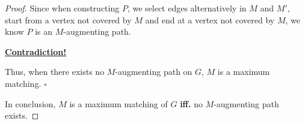 \documentclass{article}
\newcommand{\whiteqed}{\hfill $\square$\par}
\begin{document}
\begin{proof}
    \hspace{1.3em}
    Since when constructing $P$, we select edges alternatively in $M$ and $M'$, start from a vertex not covered by $M$ and end at a vertex not covered by $M$, we know $P$ is an $M$-augmenting path.
    
    \hspace{1.3em}
    \underline{\textbf{Contradiction!}}
    
    \hspace{1.3em}
    Thus, when there exists no $M$-augmenting path on $G$, $M$ is a maximum matching. \whiteqed
    
    \vspace{1.5em} \hspace{1.3em}
    In conclusion, $M$ is a maximum matching of $G$ \textbf{iff.} no $M$-augmenting path exists.
\end{proof}

\vspace{1em}
\end{document}

